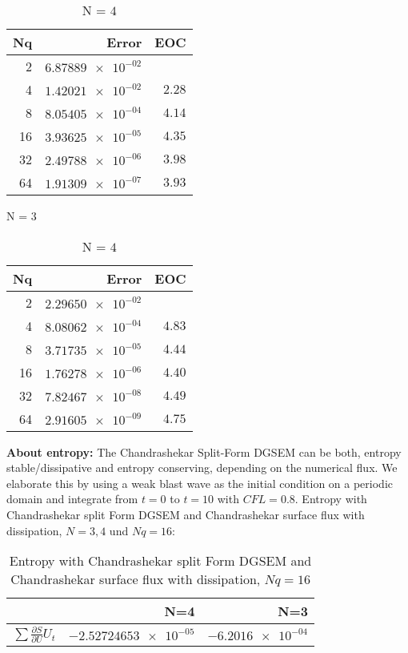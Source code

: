 \documentclass[11pt]{scrartcl}
\begin{document}
\begin{table}[H]
\parbox{.45\linewidth}{
\centering
    \begin{tabular}{|r|r|r|}
    \hline\hline
    \textbf{Nq} & \textbf{Error} & \textbf{EOC} \\\hline
    2 & $\num{6.87889e-02}$ & \\
    4 & $\num{1.42021e-02}$ & $\num{2.28}$ \\
    8 & $\num{8.05405e-04}$ & $\num{4.14}$ \\
    16 & $\num{3.93625e-05}$ & $\num{4.35}$ \\
    32 & $\num{2.49788e-06}$ & $\num{3.98}$ \\
    64 & $\num{1.91309e-07}$ & $\num{3.93}$ \\\hline\hline
  \end{tabular} 
  \caption{N = $3$}
  }
  \parbox{.45\linewidth}{
	\centering
    \begin{tabular}{|r|r|r|}
    \hline\hline
    \textbf{Nq} & \textbf{Error} & \textbf{EOC} \\\hline
    2 & $\num{2.29650e-02}$ &  \\
    4 & $\num{8.08062e-04}$ & $\num{4.83}$ \\
    8 & $\num{3.71735e-05}$ & $\num{4.44}$ \\
    16 & $\num{1.76278e-06}$ & $\num{4.40}$ \\
    32 & $\num{7.82467e-08}$ & $\num{4.49}$ \\
    64 & $\num{2.91605e-09}$ & $\num{4.75}$ \\\hline\hline
  \end{tabular}
   \caption{N = $4$}
  }
\end{table}
\textbf{About entropy:} The Chandrashekar Split-Form DGSEM can be both, entropy stable/dissipative and entropy conserving, depending on the numerical flux. We elaborate this by using a weak blast wave as the initial condition on a periodic domain and integrate from $t=0$ to $t=10$ with $CFL=0.8$. Entropy with Chandrashekar split Form DGSEM and Chandrashekar surface flux with dissipation, $N=3, 4$ und $Nq = 16$: 
\begin{table}[H]
\centering
\begin{tabular}{|r|r|r|}
    \hline\hline
     & \textbf{N=4} & \textbf{N=3} \\\hline
    $\sum \frac{\partial S}{\partial U} U_t$ & $\num{-2.52724653e-05}$ & $\num{-6.2016e-04}$ \\\hline\hline
\end{tabular}
\caption{Entropy with Chandrashekar split Form DGSEM and Chandrashekar surface flux with dissipation, $Nq = 16$}
\end{table}
\end{document}
